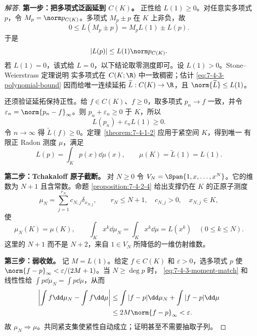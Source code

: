 \begin{proof}[解答]
\textbf{第一步：把多项式泛函延到 $C(K)$。}
正性给 $L(1)\ge0$。对任意实多项式 $p$，令 $M_p=\norm p_{C(K)}$。多项式
$M_p\pm p$ 在 $K$ 上非负，故
\[
 0\le L(M_p\pm p)=M_pL(1)\pm L(p).
\]
于是
\begin{equation}\label{eq:7-4-3-polynomial-bound}
 |L(p)|\le L(1)\norm p_{C(K)}.
\end{equation}
若 $L(1)=0$，该式给 $L=0$，以下结论取零测度即可。设 $L(1)>0$。Stone--Weierstrass 定理说明
实多项式在 $C(K;\R)$ 中一致稠密；估计 \eqref{eq:7-4-3-polynomial-bound} 因而给唯一连续延拓
$\widetilde L:C(K)\to\R$，且 $\norm{\widetilde L}\le L(1)$。

还须验证延拓保持正性。给 $f\in C(K)$、$f\ge0$，取多项式 $p_n\to f$ 一致，并令
$\varepsilon_n=\norm{p_n-f}_\infty$。则 $p_n+\varepsilon_n\ge0$ 于 $K$，所以
\[
 L(p_n)+\varepsilon_nL(1)\ge0.
\]
令 $n\to\infty$ 得 $\widetilde L(f)\ge0$。定理~\ref{theorem:7-4-1-2} 应用于紧空间 $K$，得到唯一
有限正 Radon 测度 $\mu$，满足
\[
 L(p)=\int_Kp(x)\dd\mu(x),\qquad \mu(K)=\widetilde L(1)=L(1).
\]

\textbf{第二步：Tchakaloff 原子截断。}
对 $N\ge0$ 令
$V_N=\Span\{1,x,\ldots,x^N\}$。它的维数为 $N+1$ 且含常数。命题
\ref{proposition:7-4-2-4} 给出支撑仍在 $K$ 的正原子测度
\[
 \mu_N=\sum_{j=1}^{r_N}c_{N,j}\delta_{x_{N,j}},
 \qquad r_N\le N+1,\quad c_{N,j}>0,\quad x_{N,j}\in K,
\]
使
\begin{equation}\label{eq:7-4-3-moment-match}
 \mu_N(K)=\mu(K),\qquad
 \int_Kx^k\dd\mu_N=\int_Kx^k\dd\mu=L(x^k)\quad(0\le k\le N).
\end{equation}
这里的 $N+1$ 而不是 $N+2$，来自 $1\in V_N$ 所降低的一维仿射维数。

\textbf{第三步：弱收敛。}
记 $M=L(1)$。给定 $f\in C(K)$ 和 $\varepsilon>0$，选多项式 $p$ 使
$\norm{f-p}_\infty<\varepsilon/(2M+1)$。当 $N\ge\deg p$ 时，
\eqref{eq:7-4-3-moment-match} 和线性性给 $\int p\dd\mu_N=\int p\dd\mu$，从而
\begin{align*}
 \left|\int f\dd\mu_N-\int f\dd\mu\right|
 &\le\int|f-p|\dd\mu_N+\int|f-p|\dd\mu\\
 &\le2M\norm{f-p}_\infty<\varepsilon.
\end{align*}
故 $\mu_N\Rightarrow\mu$。共同紧支集使紧性自动成立；证明甚至不需要抽取子列。


\end{proof}
